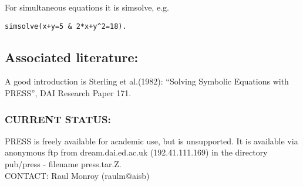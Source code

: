 For simultaneous equations it is simsolve, e.g.
\begin{verbatim}
simsolve(x+y=5 & 2*x+y^2=18). 
\end{verbatim}	


\subsection*{Associated literature:}
 A good introduction is Sterling et al.(1982):
		       ``Solving Symbolic Equations with PRESS'',
		       DAI Research Paper 171.

\subsubsection*{CURRENT STATUS:}
  PRESS is freely available for academic use, but is
  		 unsupported. It is available via anonymous ftp from
		 dream.dai.ed.ac.uk (192.41.111.169) in the directory
		 pub/press - filename press.tar.Z. \\
CONTACT: Raul Monroy (raulm@aisb)







